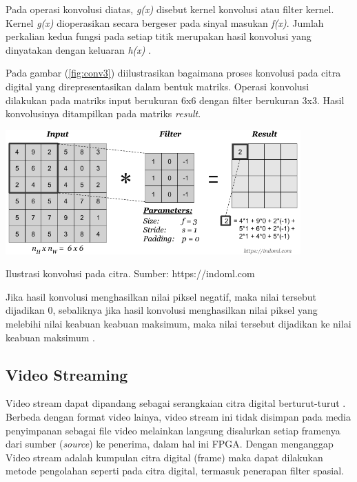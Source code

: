 Pada operasi konvolusi diatas, \textit{g(x)} disebut kernel konvolusi atau filter kernel. Kernel \textit{g(x)} dioperasikan secara bergeser pada sinyal masukan \textit{f(x)}. Jumlah perkalian kedua fungsi pada setiap titik merupakan hasil konvolusi yang dinyatakan dengan keluaran \textit{h(x)} . 

Pada gambar (\ref{fig:conv3}) diilustrasikan bagaimana proses konvolusi pada citra digital yang direpresentasikan dalam bentuk matriks. Operasi konvolusi dilakukan pada matriks input berukuran 6x6 dengan filter berukuran 3x3. Hasil konvolusinya ditampilkan pada matriks \textit{result}.
\begin{afigure}
    \includegraphics[width=0.85\textwidth, center]{images/convolution-operation.png}
    \caption{Ilustrasi konvolusi pada citra. Sumber: https://indoml.com}
    \label{fig:conv3}
\end{afigure}

Jika hasil konvolusi menghasilkan nilai piksel negatif, maka nilai tersebut dijadikan 0, sebaliknya jika hasil konvolusi menghasilkan nilai piksel yang melebihi nilai keabuan keabuan maksimum, maka nilai tersebut dijadikan ke nilai keabuan maksimum .
 

\subsection{Video Streaming}
Video stream dapat dipandang sebagai serangkaian citra digital berturut-turut . Berbeda dengan format video lainya, video stream ini tidak disimpan pada media penyimpanan sebagai file video melainkan langsung disalurkan setiap framenya dari sumber (\textit{source}) ke penerima, dalam hal ini FPGA.  Dengan menganggap Video stream adalah kumpulan citra digital (frame) maka dapat dilakukan metode pengolahan seperti pada citra digital, termasuk penerapan filter spasial. 



